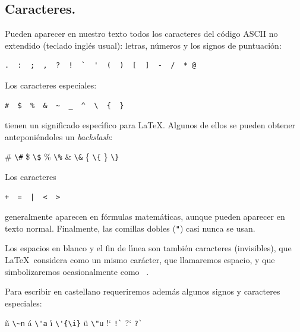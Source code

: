 \subsection{Caracteres.}

Pueden aparecer en nuestro texto todos los caracteres del c{\'o}digo
ASCII no extendido (teclado ingl{\'e}s usual): letras, n{\'u}meros y los
signos de puntuaci{\'o}n:
\begin{verbatim}
.  :  ;  ,  ?  !  `  '  (  )  [  ]  -  /  * @
\end{verbatim}
Los caracteres especiales:
\begin{verbatim}
#  $  %  &  ~  _  ^  \  {  } 
\end{verbatim} 
tienen un significado espec{\'\i}fico para \LaTeX. Algunos de ellos se
pueden obtener anteponi{\'e}ndoles un {\em backslash\/}:
\begin{center}
\# \hspace{.2cm} \verb+\#+ \hspace{.7cm}
\$ \hspace{.2cm}  \verb+\$+ \hspace{.7cm}
\% \hspace{.2cm} \verb+\%+ \hspace{.7cm}
\& \hspace{.2cm} \verb+\&+ \hspace{.7cm}
\{ \hspace{.2cm} \verb+\{+ \hspace{.7cm}
\} \hspace{.2cm} \verb+\}+ \hspace{.7cm}
\end{center}

Los caracteres 
\begin{verbatim}
+  =  |  <  >
\end{verbatim}
generalmente aparecen en f{\'o}rmulas matem{\'a}ticas, aunque pueden aparecer
en texto normal. Finalmente, las comillas dobles (\verb+"+) casi nunca
se usan.

Los espacios en blanco y el fin de l{\'\i}nea son tambi{\'e}n caracteres
(invisibles), que \LaTeX\ considera como un mismo car{\'a}cter, que
llamaremos espacio, y que simbolizaremos ocasionalmente como {\textvisiblespace}\ .

Para escribir en castellano requeriremos adem{\'a}s algunos signos y
caracteres especiales:

\begin{center}
\~n \hspace{.2cm} \verb+\~n+ \hspace{.7cm}
\'a \hspace{.2cm}  \verb+\'a+ \hspace{.7cm}
\'{\i} \hspace{.2cm} \verb+\'{\i}+ \hspace{.7cm}
\"u \hspace{.2cm} \verb+\"u+ \hspace{.7cm}
!` \hspace{.2cm} \verb+!`+ \hspace{.7cm}
?` \hspace{.2cm} \verb+?`+ \hspace{.7cm}
\end{center}

